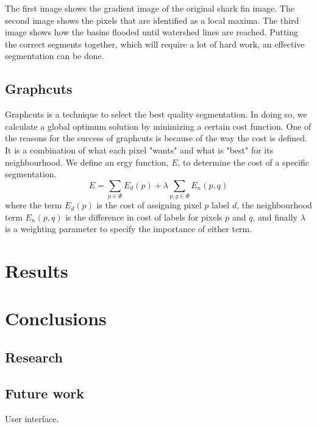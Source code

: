 \documentclass[a4paper,10pt]{article}
\begin{document}
\noindent The first image shows the gradient image of the original shark fin
image.  The second image shows the pixels that are identified as a local maxima.
 The third image shows how the basins flooded until watershed lines are reached.
 Putting the correct segments together, which will require a lot of hard work,
an effective segmentation can be done.

\subsection{Graphcuts}
Graphcuts is a technique to select the best quality segmentation.  In doing so, we calculate a global optimum solution by minimizing a certain 
cost function.  One of the reasons for the success of graphcuts is because of the way the cost is defined.  It is a combination of what each pixel
"wants" and what is "best" for its neighbourhood.  We define an ergy function, $E$, to determine the cost of a specific segmentation.
\[
 E = \sum_{p \in \Phi}E_d(p) + \lambda\sum_{p,g \in \Phi}E_n(p, q)
\]
where the term $E_d(p)$ is the cost of assigning pixel $p$ label $d$, the neighbourhood term $E_n(p, q)$ is the difference in cost of labels for pixels $p$ 
and $q$, and finally $\lambda$ is a weighting parameter to specify the importance of either term.



\newpage
\section{Results}
\subsection{}


\subsection{}


\subsection{}


\newpage
\section{Conclusions}
\subsection{Research}


\subsection{}


\subsection{Future work}
User interface.


\newpage

\end{document}
